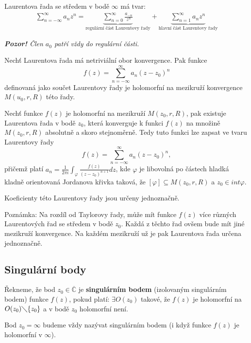 \begin{definition}
Laurentova řada se středem v bodě $\infty$ má tvar:
\begin{align*}
\sum_{n=-\infty}^{\infty}a_nz^n=\underbrace{\sum_{n=0}^{\infty}\frac{a_{-n}}{z^n}}_{\text{regulární část Laurentovy řady}}+\underbrace{\sum_{n=1}^{\infty}a_nz^n}_{\text{hlavní část Laurentovy řady}}
\end{align*}
\end{definition}

\textit{\textbf{Pozor!} Člen $a_0$ patří vždy do regulární části.}

\begin{theorem}
Nechť Laurentova řada má netriviální obor konvergence. Pak funkce 
$$
f(z)=\sum_{n=-\infty}^{\infty} a_n (z-z_0)^n
$$
definovaná jako součet Laurentovy řady je holomorfní na mezikruží konvergence $M(u_0,r,R)$ této řady.
\end{theorem}
\begin{theorem}[Laurentova]
Nechť funkce $f(z)$ je holomorfní na mezikruží $M(z_0,r,R)$, pak existuje Laurentova řada v bodě $z_0$, která konverguje k funkci $f(z) $ na množině $M(z_0,r,R)$ absolutně a skoro stejnoměrně. Tedy tuto funkci lze zapsat ve tvaru Laurentovy řady $$f(z)=\sum_{n=-\infty}^{\infty}a_n(z-z_0)^n,$$přičemž platí $a_n=\frac{1}{2\pi i}\int_{\varphi}\frac{f(z)}{(z-z_0)^{n+1}}dz$, kde $\varphi$ je libovolná po částech hladká kladně orientovaná Jordanova křivka taková, že $[\varphi]\subseteq M(z_0,r,R)$ a $z_0\in int\varphi$.

Koeficienty této Laurentovy řady jsou určeny jednoznačně.
\end{theorem}

Poznámka: Na rozdíl od Taylorovy řady, může mít funkce $f(z)$ více různých Laurentových řad se středem v bodě $z_0$. Každá z těchto řad ovšem bude mít jiné mezikruží konvergence. Na každém mezikruží už je pak Laurentova řada určena jednoznačně.

\subsection{Singulární body}
\begin{definition}
Řekneme, že bod $z_0\in \overline{\mathbb{C}}$ je \textbf{singulárním bodem} (izolovaným singulárním bodem) funkce $f(z)$, pokud platí:
$\exists O(z_0)$ takové, že $f(z)$ je holomorfní na $O(z_0)\diagdown \{z_0\}$ a v bodě $z_0$ holomorfní není. 

Bod $z_0=\infty$ budeme vždy nazývat singulárním bodem (i když funkce $f(z)$ je holomorfní v $\infty$).
\end{definition}

